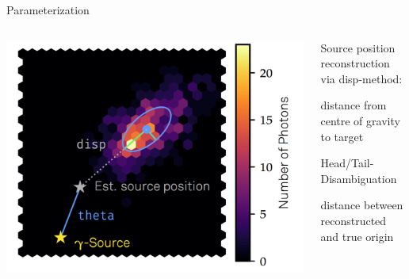 \begin{frame}[t]{Parameterization}
    \begin{columns}[onlytextwidth]
        \begin{column}{0.475\textwidth}
            \includegraphics[width=\textwidth]{fig/disp.png}
        \end{column}
        \begin{column}{0.475\textwidth}
            Source position reconstruction via disp-method:
            \begin{description}
                \item[|disp|] distance from centre of gravity to target
                \item[sgn(disp)] Head/Tail-Disambiguation
                \item[theta] distance between reconstructed and true origin
            \end{description}
        \end{column}
    \end{columns}
\end{frame}

